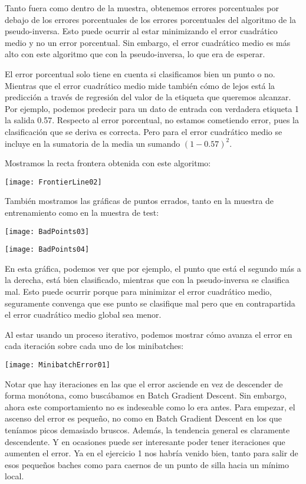 \documentclass[11pt]{article}
\begin{document}
Tanto fuera como dentro de la muestra, obtenemos errores porcentuales por debajo de los errores porcentuales de los errores porcentuales del algoritmo de la pseudo-inversa. Esto puede ocurrir al estar minimizando el error cuadrático medio y no un error porcentual. Sin embargo, el error cuadrático medio es más alto con este algoritmo que con la pseudo-inversa, lo que era de esperar.

El error porcentual solo tiene en cuenta si clasificamos bien un punto o no. Mientras que el error cuadrático medio mide también cómo de lejos está la predicción a través de regresión del valor de la etiqueta que queremos alcanzar. Por ejemplo, podemos predecir para un dato de entrada con verdadera etiqueta 1 la salida 0.57. Respecto al error porcentual, no estamos cometiendo error, pues la clasificación que se deriva es correcta. Pero para el error cuadrático medio se incluye en la sumatoria de la media un sumando $(1 - 0.57)^2$.

Mostramos la recta frontera obtenida con este algoritmo:

\texttt{[image: FrontierLine02]}

También mostramos las gráficas de puntos errados, tanto en la muestra de entrenamiento como en la muestra de test:

\texttt{[image: BadPoints03]}

\texttt{[image: BadPoints04]}

En esta gráfica, podemos ver que por ejemplo, el punto que está el segundo más a la derecha, está bien clasificado, mientras que con la pseudo-inversa se clasifica mal. Esto puede ocurrir porque para minimizar el error cuadrático medio, seguramente convenga que ese punto se clasifique mal pero que en contrapartida el error cuadrático medio global sea menor.

Al estar usando un proceso iterativo, podemos mostrar cómo avanza el error en cada iteración sobre cada uno de los minibatches:

\texttt{[image: MinibatchError01]}

Notar que hay iteraciones en las que el error asciende en vez de descender de forma monótona, como buscábamos en Batch Gradient Descent. Sin embargo, ahora este comportamiento no es indeseable como lo era antes. Para empezar, el ascenso del error es pequeño, no como en Batch Gradient Descent en los que teníamos picos demasiado bruscos. Además, la tendencia general es claramente descendente. Y en ocasiones puede ser interesante poder tener iteraciones que aumenten el error. Ya en el ejercicio 1 nos habría venido bien, tanto para salir de esos pequeños baches como para caernos de un punto de silla hacia un mínimo local.
\end{document}
